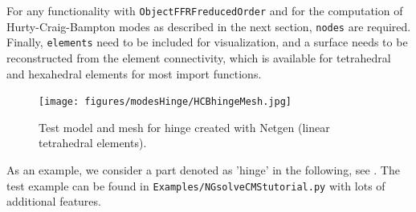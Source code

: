 For any functionality with \texttt{ObjectFFRFreducedOrder} and for the computation of Hurty-Craig-Bampton modes as described in the next section, \texttt{nodes}
are required.
Finally, \texttt{elements} need to be included for visualization, and a surface needs to be reconstructed from the element connectivity, which is available for tetrahedral and hexahedral elements for most import functions.

\begin{figure}[tbph]
  \begin{center}
  \texttt{[image: figures/modesHinge/HCBhingeMesh.jpg]}
  \end{center}
  \caption{Test model and mesh for hinge created with Netgen (linear tetrahedral elements).}
	\label{fig_hingePartMesh}
\end{figure}
As an example, we consider a part denoted as 'hinge' in the following, see . The test example can be found in \texttt{Examples/NGsolveCMStutorial.py} with lots of additional features.

